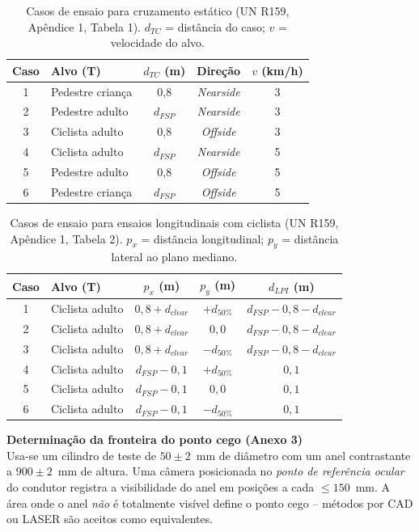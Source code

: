 \documentclass[11pt,a4paper]{article}
\newcommand{\destaque}[2]{%
  \begin{center}
  \begin{minipage}{0.96\linewidth}
  \colorbox{azulclaro}{\parbox{\dimexpr\linewidth-2\fboxsep}{%
  \textbf{\textcolor{azulun}{#1}}\\[2pt]\small #2}}
  \end{minipage}
  \end{center}}
\begin{document}
\begin{table}[H]
\centering
\caption{Casos de ensaio para cruzamento estático (UN R159, Apêndice 1,
Tabela 1). $d_{TC}$ = distância do caso; $v$ = velocidade do alvo.}
\label{tab:tc159a}
\small
\begin{tabular}{clccc}
\toprule
\textbf{Caso} & \textbf{Alvo (T)} & \textbf{$d_{TC}$ (m)} &
\textbf{Direção} & \textbf{$v$ (km/h)} \\
\midrule
1 & Pedestre criança & 0,8 & \emph{Nearside} & 3 \\
2 & Pedestre adulto & $d_{FSP}$ & \emph{Nearside} & 3 \\
3 & Ciclista adulto & 0,8 & \emph{Offside} & 3 \\
4 & Ciclista adulto & $d_{FSP}$ & \emph{Nearside} & 5 \\
5 & Pedestre adulto & 0,8 & \emph{Offside} & 5 \\
6 & Pedestre criança & $d_{FSP}$ & \emph{Offside} & 5 \\
\bottomrule
\end{tabular}
\end{table}

\begin{table}[H]
\centering
\caption{Casos de ensaio para ensaios longitudinais com ciclista (UN R159,
Apêndice 1, Tabela 2). $p_x$ = distância longitudinal; $p_y$ = distância
lateral ao plano mediano.}
\label{tab:tc159b}
\small
\begin{tabular}{clccc}
\toprule
\textbf{Caso} & \textbf{Alvo (T)} & \textbf{$p_x$ (m)} & \textbf{$p_y$ (m)} &
\textbf{$d_{LPI}$ (m)} \\
\midrule
1 & Ciclista adulto & $0{,}8+d_{clear}$ & $+d_{50\%}$ & $d_{FSP}-0{,}8-d_{clear}$ \\
2 & Ciclista adulto & $0{,}8+d_{clear}$ & $0{,}0$ & $d_{FSP}-0{,}8-d_{clear}$ \\
3 & Ciclista adulto & $0{,}8+d_{clear}$ & $-d_{50\%}$ & $d_{FSP}-0{,}8-d_{clear}$ \\
4 & Ciclista adulto & $d_{FSP}-0{,}1$ & $+d_{50\%}$ & $0{,}1$ \\
5 & Ciclista adulto & $d_{FSP}-0{,}1$ & $0{,}0$ & $0{,}1$ \\
6 & Ciclista adulto & $d_{FSP}-0{,}1$ & $-d_{50\%}$ & $0{,}1$ \\
\bottomrule
\end{tabular}
\end{table}

\destaque{Determinação da fronteira do ponto cego (Anexo 3)}{Usa-se um cilindro
de teste de $50\pm2$~mm de diâmetro com um anel contrastante a $900\pm2$~mm de
altura. Uma câmera posicionada no \emph{ponto de referência ocular} do condutor
registra a visibilidade do anel em posições a cada $\leq150$~mm. A área onde o
anel \emph{não} é totalmente visível define o ponto cego -- métodos por CAD ou
LASER são aceitos como equivalentes.}
\end{document}
